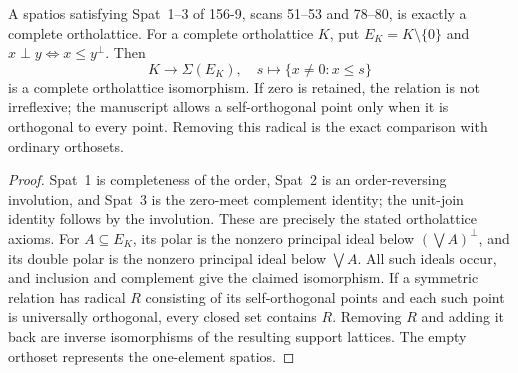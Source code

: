 \begin{theorem}
\label{SA21-A21}
A spatios satisfying Spat~1--3 of 156-9, scans 51--53 and 78--80,
is exactly a complete ortholattice. For a complete ortholattice $K$,
put $E_K=K\setminus\{0\}$ and $x\perp y\iff x\leq y^\perp$.
Then
\[
 K\longrightarrow\Sigma(E_K),\quad
 s\longmapsto\{x\ne0:x\leq s\}
\]
is a complete ortholattice isomorphism. If zero is retained, the
relation is not irreflexive; the manuscript allows a self-orthogonal
point only when it is orthogonal to every point. Removing this
radical is the exact comparison with ordinary orthosets.
\end{theorem}
\begin{proof}
Spat~1 is completeness of the order, Spat~2 is an order-reversing
involution, and Spat~3 is the zero-meet complement identity; the
unit-join identity follows by the involution. These are precisely
the stated ortholattice axioms. For $A\subseteq E_K$, its polar is
the nonzero principal ideal below $(\bigvee A)^\perp$, and its
double polar is the nonzero principal ideal below $\bigvee A$.
All such ideals occur, and inclusion and complement give the claimed
isomorphism. If a symmetric relation has radical $R$ consisting of
its self-orthogonal points and each such point is universally
orthogonal, every closed set contains $R$. Removing $R$ and adding
it back are inverse isomorphisms of the resulting support lattices.
The empty orthoset represents the one-element spatios.
\end{proof}

